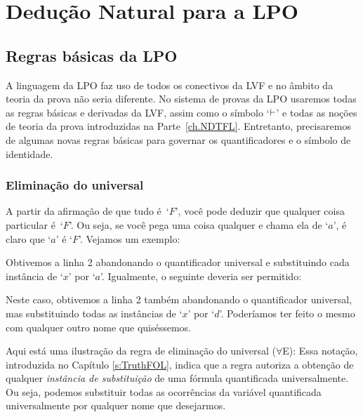 \part{Dedução Natural para a LPO}
\label{ch.NDFOL}

 

\chapter{Regras básicas da LPO}\label{s:BasicFOL}

A linguagem da LPO faz uso de todos os conectivos da LVF e no âmbito da teoria da prova não seria diferente. No sistema de provas da LPO usaremos todas as regras básicas e derivadas da LVF, assim como o símbolo `$\vdash$' e todas as noções de teoria da prova introduzidas na Parte~\ref{ch.NDTFL}. Entretanto, precisaremos de algumas novas regras básicas para governar os quantificadores e o símbolo de identidade. 

 
\section{Eliminação do universal}

A partir da afirmação de que tudo é~`$F$', você pode deduzir que qualquer coisa particular é~`$F$’.  Ou seja, se você pega uma coisa qualquer e chama ela de `$a$', é claro que `$a$' é `$F$'.
Vejamos um exemplo:
\begin{fitchproof}
	 
\end{fitchproof}
 Obtivemos a linha 2 abandonando o quantificador universal e substituindo cada instância de `$x$' por `$a$'. Igualmente, o seguinte deveria ser permitido:
\begin{fitchproof}
	 
\end{fitchproof}
 
Neste caso, obtivemos a linha 2 também abandonando o quantificador universal, mas substituindo todas as instâncias de `$x$' por `$d$'. Poderíamos ter feito o mesmo com qualquer outro nome que quiséssemos.

Aqui está uma ilustração da regra de eliminação do universal ($\forall$E):
Essa notação, introduzida no Capítulo  \ref{s:TruthFOL}, indica que a regra autoriza a obtenção de qualquer \emph{instância de substituição} de uma fórmula quantificada universalmente. Ou seja, podemos substituir todas as ocorrências da variável quantificada universalmente por qualquer nome que desejarmos.

